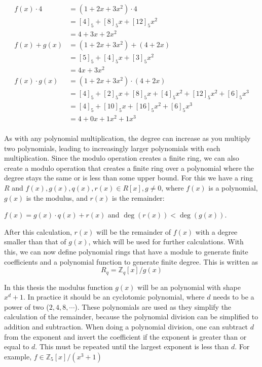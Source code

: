 \begin{align*}
  f(x)\cdot 4    & = (1+2x+3x^2) \cdot 4                             \\
                 & = [4]_5+[8]_5x+[12]_5x^2                          \\
                 & = 4+3x+2x^2                                       \\
  f(x)+g(x)      & = (1+2x+3x^2)+(4+2x)                              \\
                 & = [5]_5+[4]_5x+[3]_5x^2                           \\
                 & = 4x+3x^2                                         \\
  f(x)\cdot g(x) & = (1+2x+3x^2)\cdot(4+2x)                          \\ 
                 & = [4]_5+[2]_5x+[8]_5x+[4]_5x^2+[12]_5x^2+[6]_5x^3 \\
                 & = [4]_5+[10]_5x+[16]_5x^2+[6]_5x^3                \\
                 & = 4+0x+1x^2+1x^3                                  \\
\end{align*}

As with any polynomial multiplication, the degree can increase as you multiply two polynomials, leading to increasingly larger polynomials with each multiplication. Since the modulo operation creates a finite ring, we can also create a modulo operation that creates a finite ring over a polynomial where the degree stays the same or is less than some upper bound. For this we have a ring $R$ and $f(x), g(x), q(x), r(x) \in R[x], g\neq 0$, where $f(x)$ is a polynomial, $g(x)$ is the modulus, and $r(x)$ is the remainder:
\begin{center}
  $f(x) = g(x)\cdot q(x) + r(x) $ and $\deg(r(x))<\deg(g(x))$.
\end{center}

After this calculation, $r(x)$ will be the remainder of $f(x)$ with a degree smaller than that of $g(x)$, which will be used for further calculations. With this, we can now define polynomial rings that have a module to generate finite coefficients and a polynomial function to generate finite degree. This is written as 
$$R_q = \mathbb{Z}_q[x]/g(x)$$


In this thesis the modulus function $g(x)$ will be an polynomial with shape $x^d+1$. In practice it should be an cyclotomic polynomial, where $d$ needs to be a power of two ($2,4,8, \cdots$). These polynomials are used as they simplify the calculation of the remainder, because the polynomial division can be simplified to addition and subtraction. When doing a polynomial division, one can subtract $d$ from the exponent and invert the coefficient if the exponent is greater than or equal to $d$. This must be repeated until the largest exponent is less than $d$. For example, $f \in \mathbb{Z}_5[x]/(x^3+1)$

